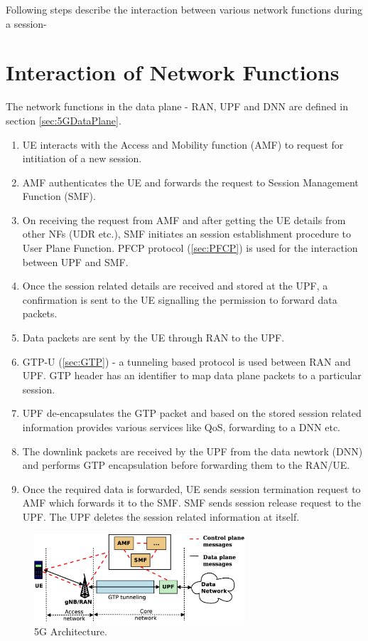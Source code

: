 Following steps describe the interaction between various network functions during a session-
\section{Interaction of Network Functions}
The network functions in the data plane - RAN, UPF and DNN are defined in section \ref{sec:5GDataPlane}.

\begin{enumerate}
	\item UE interacts with the Access and Mobility function (AMF) to request for intitiation of a new session.
	\item AMF authenticates the UE and forwards the request to Session Management Function (SMF).
	\item On receiving the request from AMF and after getting the UE details from other NFs (UDR etc.),
	SMF initiates an session establishment procedure to User Plane Function. PFCP protocol (\ref{sec:PFCP}) is used for the interaction between 
	UPF and SMF.
	\item Once the session related details are received and stored at the UPF, a confirmation is sent to the 
	UE signalling the permission to forward data packets. 
	\item Data packets are sent by the UE through RAN to the UPF. 
	\item GTP-U (\ref{sec:GTP}) - a tunneling based protocol is used between RAN and UPF. GTP header has an identifier to map data plane packets 
	to a particular session. 
	\item UPF de-encapsulates the GTP packet and based on the stored session 
	related information provides various services like QoS, forwarding to a DNN etc. 
	\item The downlink packets are received by the UPF from the data newtork (DNN) and performs GTP encapsulation before forwarding them to the RAN/UE.  	
	\item Once the required data is forwarded, UE sends session termination request to AMF which forwards it to the SMF. SMF sends session release request to the UPF. The UPF deletes the session related information  at itself. 
\end{enumerate}
 
\begin{figure}[htbp]
	\centering
       \includegraphics[width=0.7\textwidth]{fig/5g_arch.eps}
       \setlength{\belowcaptionskip}{-12pt}
	\caption{5G Architecture.}
	\label{fig:5g_arch}
       \end{figure}
       




